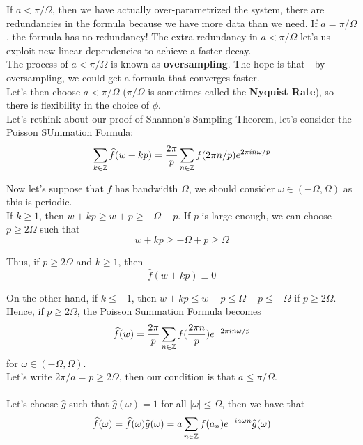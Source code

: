\documentclass{article}
\begin{document}
If $a < \pi/\Omega$, then we have actually over-parametrized the system, there are redundancies in the formula because we have more data than we need. If $a = \pi/\Omega$, the formula has no redundancy! The extra redundancy in $a < \pi/\Omega$ let's us exploit new linear dependencies to achieve a faster decay.\\

The process of $a < \pi/\Omega$ is known as \textbf{oversampling}. The hope is that - by oversampling, we could get a formula that converges faster.\\

Let's then choose $a < \pi/\Omega$ ($\pi/\Omega$ is sometimes called the \textbf{Nyquist Rate}), so there is flexibility in the choice of $\phi$.\\

Let's rethink about our proof of Shannon's Sampling Theorem, let's consider the Poisson SUmmation Formula:
\[\sum_{k \in \mathbb{Z}} \widehat{f}(w + kp) = \frac{2\pi}{p} \sum_{n \in \mathbb{Z}} f(2\pi n/p) e^{2\pi i n \omega/p}\]

Now let's suppose that $f$ has bandwidth $\Omega$, we should consider $\omega \in (-\Omega, \Omega)$ as this is periodic.\\

If $k \geq 1$, then $w + kp \geq w + p \geq -\Omega + p$. If $p$ is large enough, we can choose $p \geq 2\Omega$ such that
\[w + kp \geq -\Omega + p \geq \Omega\]

Thus, if $p \geq 2 \Omega$ and $k \geq 1$, then
\[\widehat{f}(w + kp) \equiv 0\]

On the other hand, if $k \leq -1$, then $w + kp \leq w - p \leq \Omega - p \leq -\Omega$ if $p \geq 2 \Omega$.\\

Hence, if $p \geq 2\Omega$, the Poisson Summation Formula becomes
\[\widehat{f}(w) = \frac{2\pi}{p} \sum_{n \in \mathbb{Z}} f(\frac{2\pi n}{p}) e^{-2\pi i n \omega/p}\]
for $\omega \in (-\Omega, \Omega)$.\\

Let's write $2\pi/a = p \geq 2\Omega$, then our condition is that $a \leq \pi/\Omega$.\\\\

Let's choose $\widehat{g}$ such that $\widehat{g}(\omega) = 1$ for all $|\omega| \leq \Omega$, then we have that
\[\widehat{f}(\omega) = \widehat{f}(\omega) \widehat{g}(\omega) = a \sum_{n \in \mathbb{Z}} f(a_n) e^{-i a \omega n} \widehat{g}(\omega)\]
\end{document}
